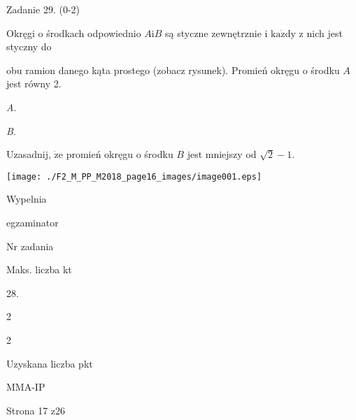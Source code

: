 \documentclass[a4paper,12pt]{article}
\begin{document}
Zadanie 29. (0-2)

Okręgi o środkach odpowiednio $A\mathrm{i}B$ są styczne zewnętrznie i $\mathrm{k}\mathrm{a}\dot{\mathrm{z}}\mathrm{d}\mathrm{y}$ z nich jest styczny do

obu ramion danego kąta prostego (zobacz rysunek). Promień okręgu o środku $A$ jest równy 2.

{\it A}.

{\it B}.

Uzasadnij, $\dot{\mathrm{z}}\mathrm{e}$ promień okręgu o środku $B$ jest mniejszy od $\sqrt{2}-1.$
\begin{center}
\texttt{[image: ./F2\_M\_PP\_M2018\_page16\_images/image001.eps]}
\end{center}
Wypelnia

egzaminator

Nr zadania

Maks. liczba kt

28.

2

2

Uzyskana liczba pkt

MMA-IP

Strona 17 z26
\end{document}
